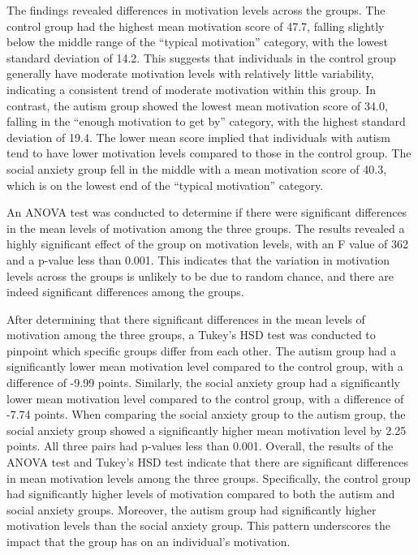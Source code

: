 \documentclass[
  letterpaper,
  number,
  review,
  3p]{elsarticle}
\begin{document}
The findings revealed differences in motivation levels across the
groups. The control group had the highest mean motivation score of 47.7,
falling slightly below the middle range of the ``typical motivation''
category, with the lowest standard deviation of 14.2. This suggests that
individuals in the control group generally have moderate motivation
levels with relatively little variability, indicating a consistent trend
of moderate motivation within this group. In contrast, the autism group
showed the lowest mean motivation score of 34.0, falling in the ``enough
motivation to get by'' category, with the highest standard deviation of
19.4. The lower mean score implied that individuals with autism tend to
have lower motivation levels compared to those in the control group. The
social anxiety group fell in the middle with a mean motivation score of
40.3, which is on the lowest end of the ``typical motivation'' category.

An ANOVA test was conducted to determine if there were significant
differences in the mean levels of motivation among the three groups. The
results revealed a highly significant effect of the group on motivation
levels, with an F value of 362 and a p-value less than 0.001. This
indicates that the variation in motivation levels across the groups is
unlikely to be due to random chance, and there are indeed significant
differences among the groups.

After determining that there significant differences in the mean levels
of motivation among the three groups, a Tukey's HSD test was conducted
to pinpoint which specific groups differ from each other. The autism
group had a significantly lower mean motivation level compared to the
control group, with a difference of -9.99 points. Similarly, the social
anxiety group had a significantly lower mean motivation level compared
to the control group, with a difference of -7.74 points. When comparing
the social anxiety group to the autism group, the social anxiety group
showed a significantly higher mean motivation level by 2.25 points. All
three pairs had p-values less than 0.001. \clearpage Overall, the
results of the ANOVA test and Tukey's HSD test indicate that there are
significant differences in mean motivation levels among the three
groups. Specifically, the control group had significantly higher levels
of motivation compared to both the autism and social anxiety groups.
Moreover, the autism group had significantly higher motivation levels
than the social anxiety group. This pattern underscores the impact that
the group has on an individual's motivation.
\end{document}
